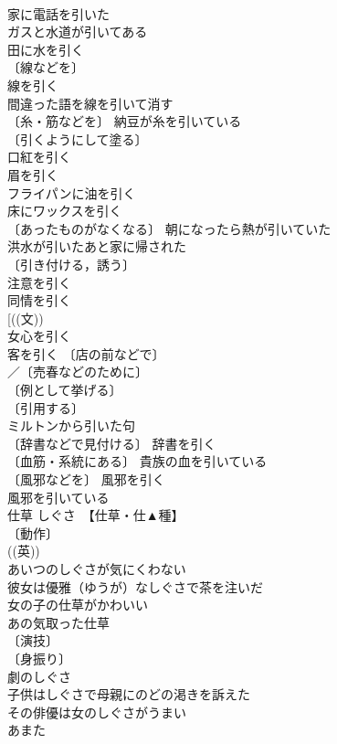 \documentclass[8pt]{extreport}
\begin{document}
\begin{CJK}{UTF8}{min}
\\	家に電話を引いた 
\\	ガスと水道が引いてある 
\\	田に水を引く 
\\	〔線などを〕
\\	線を引く 
\\	間違った語を線を引いて消す 
\\	〔糸・筋などを〕 納豆が糸を引いている 
\\	〔引くようにして塗る〕
\\	口紅を引く 
\\	眉を引く 
\\	フライパンに油を引く 
\\	床にワックスを引く 
\\	〔あったものがなくなる〕 朝になったら熱が引いていた 
\\	洪水が引いたあと家に帰された 
\\	〔引き付ける，誘う〕
\\	注意を引く 
\\	同情を引く 
\\	[((文))
\\	女心を引く 
\\	客を引く 〔店の前などで〕
\\	／〔売春などのために〕
\\	〔例として挙げる〕
\\	〔引用する〕
\\	ミルトンから引いた句 
\\	〔辞書などで見付ける〕 辞書を引く 
\\	〔血筋・系統にある〕 貴族の血を引いている 
\\	〔風邪などを〕 風邪を引く 
\\	風邪を引いている 
\\	仕草	しぐさ　【仕草・仕▲種】	
\\	〔動作〕
\\	((英)) 
\\	あいつのしぐさが気にくわない 
\\	彼女は優雅（ゆうが）なしぐさで茶を注いだ 
\\	女の子の仕草がかわいい 
\\	あの気取った仕草 
\\	〔演技〕
\\	〔身振り〕
\\	劇のしぐさ 
\\	子供はしぐさで母親にのどの渇きを訴えた 
\\	その俳優は女のしぐさがうまい 
\\	あまた		

\end{CJK}
\end{document}
